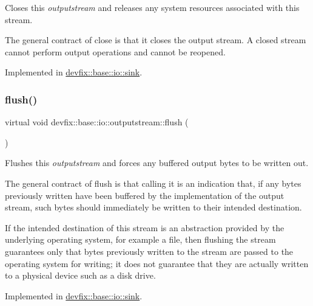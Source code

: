 Closes this {\itshape outputstream} and releases any system resources associated with this stream. 

The general contract of close is that it closes the output stream. A closed stream cannot perform output operations and cannot be reopened. 

Implemented in \hyperlink{structdevfix_1_1base_1_1io_1_1sink_a2b13891b8bb50f6d1a01c52d58154bc5}{devfix\+::base\+::io\+::sink}.

\mbox{\label{structdevfix_1_1base_1_1io_1_1outputstream_a3fe3b34675a2d70331e6ca235388e0cc}} 
\subsubsection{\texorpdfstring{flush()}{flush()}}
{\footnotesize\ttfamily virtual void devfix\+::base\+::io\+::outputstream\+::flush (\begin{DoxyParamCaption}{ }\end{DoxyParamCaption})\hspace{0.3cm}{\ttfamily [pure virtual]}}



Flushes this {\itshape outputstream} and forces any buffered output bytes to be written out. 

The general contract of flush is that calling it is an indication that, if any bytes previously written have been buffered by the implementation of the output stream, such bytes should immediately be written to their intended destination.

If the intended destination of this stream is an abstraction provided by the underlying operating system, for example a file, then flushing the stream guarantees only that bytes previously written to the stream are passed to the operating system for writing; it does not guarantee that they are actually written to a physical device such as a disk drive. 

Implemented in \hyperlink{structdevfix_1_1base_1_1io_1_1sink_ae19459626df6d3c9ad313e2171a67c3f}{devfix\+::base\+::io\+::sink}.

\mbox{\label{structdevfix_1_1base_1_1io_1_1outputstream_a52bd2eac8f6fbc496eab5138a48d2f06}} 
